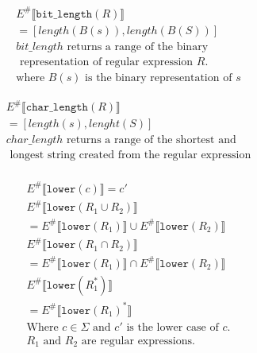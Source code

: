 \begin{align*}
    E^\# \llbracket \texttt{bit\_length} (R) \rrbracket \\
    =  [length(B(s)), length(B(S))]                     \\
    bit\_length \text{ returns a range of the binary}   \\
    \text{ representation of regular expression } R.    \\
    \text{where } B(s) \text{ is the binary representation of }s
\end{align*}

\begin{align*}
    E^\# \llbracket \texttt{char\_length} (R) \rrbracket       \\
    =  [length(s), lenght(S)]                                  \\
    char\_length \text{ returns a range of the shortest and}   \\
    \text{ longest string created from the regular expression} \\
\end{align*}

\begin{align*}
    E^\# \llbracket \texttt{lower} (c) \rrbracket =c'                                                    \\
    E^\# \llbracket \texttt{lower}(R_1 \cup R_2) \rrbracket                                              \\
    = E^\# \llbracket \texttt{lower}(R_1) \rrbracket \cup E^\# \llbracket \texttt{lower}(R_2) \rrbracket \\
    E^\# \llbracket \texttt{lower}(R_1 \cap R_2) \rrbracket                                              \\
    = E^\# \llbracket \texttt{lower}(R_1) \rrbracket \cap E^\# \llbracket \texttt{lower}(R_2) \rrbracket \\
    E^\# \llbracket \texttt{lower}(R_1^*) \rrbracket                                                     \\
    = E^\# \llbracket \texttt{lower}(R_1)^* \rrbracket                                                   \\
    \text{Where }c \in \Sigma \text{ and } c' \text{ is the lower case of } c.                           \\
    R_1 \text{ and } R_2 \text{ are regular expressions.}                                                \\
\end{align*}

